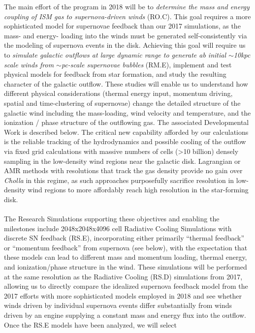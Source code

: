 \documentclass[11pt,letterpaper,english]{article}
\begin{document}
The main effort of the program in 2018 will be to \textit{determine the mass and energy coupling of ISM gas
to supernova-driven winds} (RO.C). This goal requires a more sophisticated model for supernovae feedback than our
2017 simulations, as the mass- and energy- loading into the winds must be generated self-consistently via the
modeling of supernova events in the disk. Achieving this goal will require us to
\textit{simulate galactic outflows at large dynamic
range to generate ab initial $\sim$10kpc scale winds from $\sim$pc-scale supernovae bubbles} (RM.E), 
implement and test physical models for feedback from star formation, and study the resulting character of the galactic outflow. These studies will enable us to understand how different physical considerations (thermal energy input, momentum driving, spatial and time-clustering of supernovae) change the detailed structure of the galactic wind including the mass-loading, wind velocity and temperature, and the ionization / phase structure of the outflowing gas. The associated Developmental Work is described below.
The critical new capability afforded by our calculations is the reliable tracking of the hydrodynamics and possible cooling of the outflow via fixed grid calculations with massive numbers of cells (>10 billion) densely sampling in the low-density wind regions near the galactic disk. Lagrangian or AMR methods with resolutions that track the gas density provide no gain over 
\textit{Cholla} in this regime, as such approaches purposefully sacrifice resolution in low-density wind regions to more affordably reach high resolution in the star-forming disk. 
~\\~\\
The Research Simulations supporting these objectives and enabling the milestones include 
2048x2048x4096 cell Radiative Cooling Simulations
with discrete SN feedback (RS.E), incorporating
either primarily ``thermal feedback'' or ``momentum feedback'' from supernova (see below), with the expectation that these
models can lead to different mass and momentum loading, thermal energy, and ionization/phase structure in the wind.  These
simulations will be performed at the same resolution as the Radiative Cooling (RS.D) simulations from 2017, allowing us to
directly compare the idealized supernova feedback model from the 2017 efforts with more sophisticated models employed in
2018 and see whether winds driven by individual supernova events differ substantially from winds driven by an engine
supplying a constant mass and energy flux into the outflow.  Once the RS.E models have been analyzed, we will select
\end{document}
